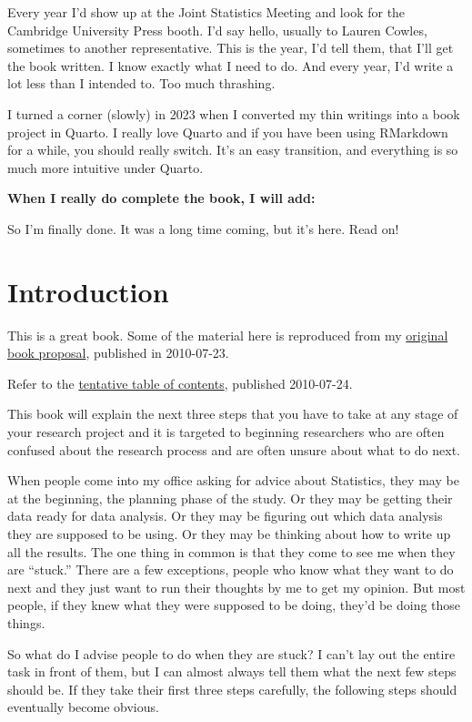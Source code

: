 \documentclass[
  letterpaper,
  DIV=11,
  numbers=noendperiod]{scrreprt}
\begin{document}
Every year I'd show up at the Joint Statistics Meeting and look for the
Cambridge University Press booth. I'd say hello, usually to Lauren
Cowles, sometimes to another representative. This is the year, I'd tell
them, that I'll get the book written. I know exactly what I need to do.
And every year, I'd write a lot less than I intended to. Too much
thrashing.

I turned a corner (slowly) in 2023 when I converted my thin writings
into a book project in Quarto. I really love Quarto and if you have been
using RMarkdown for a while, you should really switch. It's an easy
transition, and everything is so much more intuitive under Quarto.

\textbf{When I really do complete the book, I will add:}

So I'm finally done. It was a long time coming, but it's here. Read on!


\chapter{Introduction}\label{introduction}

This is a great book. Some of the material here is reproduced from my
\href{http://www.pmean.com/10/SecondBook.html}{original book proposal},
published in 2010-07-23.

Refer to the \href{http://www.pmean.com/10/Contents.html}{tentative
table of contents}, published 2010-07-24.

This book will explain the next three steps that you have to take at any
stage of your research project and it is targeted to beginning
researchers who are often confused about the research process and are
often unsure about what to do next.

When people come into my office asking for advice about Statistics, they
may be at the beginning, the planning phase of the study. Or they may be
getting their data ready for data analysis. Or they may be figuring out
which data analysis they are supposed to be using. Or they may be
thinking about how to write up all the results. The one thing in common
is that they come to see me when they are ``stuck.'' There are a few
exceptions, people who know what they want to do next and they just want
to run their thoughts by me to get my opinion. But most people, if they
knew what they were supposed to be doing, they'd be doing those things.

So what do I advise people to do when they are stuck? I can't lay out
the entire task in front of them, but I can almost always tell them what
the next few steps should be. If they take their first three steps
carefully, the following steps should eventually become obvious.
\end{document}
